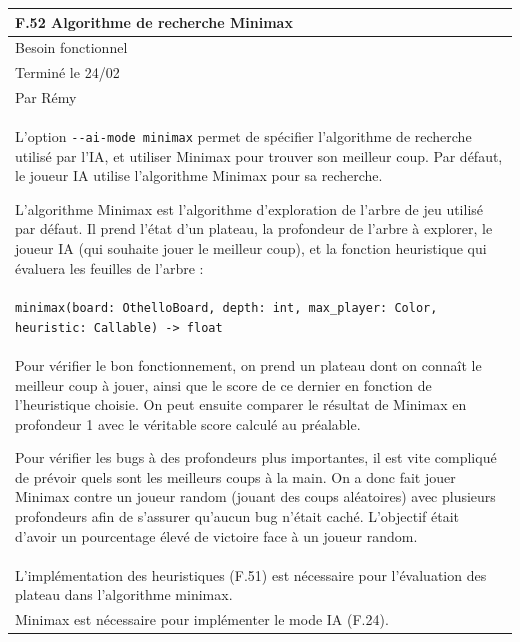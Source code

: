 \documentclass[a4paper,12pt]{article}
\begin{document}
\vspace{1cm}

\noindent
\setlength{\arrayrulewidth}{1.5pt}
\renewcommand{\arraystretch}{1.5}
\begin{tabularx}{\textwidth}{|X|}
    \hline
    \textbf{F.52 Algorithme de recherche Minimax}                                                       \\
    \hline
    Besoin fonctionnel                                                                                  \\
    \hline
    Terminé le 24/02                                                                                    \\
    Par Rémy                                                                                            \\
    \hline
    L’option \texttt{-}\texttt{-ai-mode minimax} permet de spécifier l’algorithme de recherche utilisé par l’IA, et utiliser Minimax pour trouver son meilleur coup.
    Par défaut, le joueur IA utilise l’algorithme Minimax pour sa recherche.

    L’algorithme Minimax est l’algorithme d’exploration de l’arbre de jeu utilisé
    par défaut. Il prend l’état d’un plateau, la profondeur de l’arbre à explorer,
    le joueur IA (qui souhaite jouer le meilleur coup), et la fonction heuristique
    qui évaluera les feuilles de l’arbre :                                                              \\

    \texttt{minimax(board: OthelloBoard, depth: int, max\_player: Color, heuristic: Callable) -> float} \\
    \arrayrulecolor{MediumAquamarine}\hline
    \arrayrulecolor{CornflowerBlue}
    Pour vérifier le bon fonctionnement, on prend un plateau dont on connaît le meilleur coup à jouer, ainsi que le score de ce dernier en fonction de l’heuristique choisie. On peut ensuite comparer le résultat de Minimax en profondeur 1 avec le véritable score calculé au préalable.

    Pour vérifier les bugs à des profondeurs plus importantes, il est vite
    compliqué de prévoir quels sont les meilleurs coups à la main. On a donc fait
    jouer Minimax contre un joueur random (jouant des coups aléatoires) avec
    plusieurs profondeurs afin de s’assurer qu’aucun bug n’était caché. L’objectif
    était d’avoir un pourcentage élevé de victoire face à un joueur random.                             \\
    \arrayrulecolor{MediumAquamarine}\hline \arrayrulecolor{CornflowerBlue}
    L'implémentation des heuristiques (F.51) est nécessaire pour l'évaluation des
    plateau dans l'algorithme minimax.                                                                  \\ Minimax est nécessaire pour implémenter
    le mode IA (F.24).                                                                                  \\ \hline
\end{tabularx}
\end{document}
